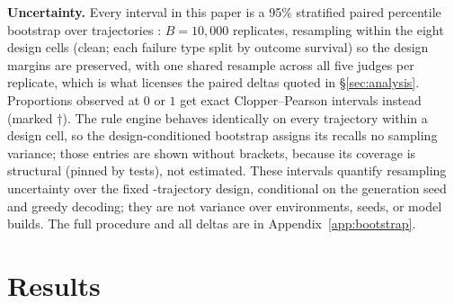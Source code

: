 \documentclass{article}
\begin{document}
\textbf{Uncertainty.} Every interval in this paper is a 95\% stratified paired percentile
bootstrap over trajectories \citep{efron1979bootstrap}: $B{=}10{,}000$ replicates, resampling
within the eight design cells (clean; each failure type split by outcome survival) so the
design margins are preserved, with one shared resample across all five judges per
replicate, which is what licenses the paired deltas quoted in \S\ref{sec:analysis}.
Proportions observed at $0$ or $1$ get exact Clopper--Pearson intervals instead (marked
$\dagger$). The rule engine behaves identically on every trajectory within a design cell, so
the design-conditioned bootstrap assigns its recalls no sampling variance; those entries are
shown without brackets, because its coverage is structural (pinned by tests), not estimated.
These intervals quantify resampling uncertainty over the fixed \tjNTraj{}-trajectory design,
conditional on the generation seed and greedy decoding; they are not variance over
environments, seeds, or model builds. The full procedure and all deltas are in
Appendix~\ref{app:bootstrap}.

\section{Results}
\label{sec:results}
\end{document}
